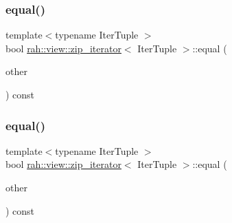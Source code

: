 \subsubsection{\texorpdfstring{equal()}{equal()}\hspace{0.1cm}{\footnotesize\ttfamily [1/2]}}
{\footnotesize\ttfamily template$<$typename Iter\+Tuple $>$ \\
bool \mbox{\hyperlink{structrah_1_1view_1_1zip__iterator}{rah\+::view\+::zip\+\_\+iterator}}$<$ Iter\+Tuple $>$\+::equal (\begin{DoxyParamCaption}\item[{\mbox{\hyperlink{structrah_1_1view_1_1zip__iterator}{zip\+\_\+iterator}}$<$ Iter\+Tuple $>$}]{other }\end{DoxyParamCaption}) const\hspace{0.3cm}{\ttfamily [inline]}}

\mbox{\label{structrah_1_1view_1_1zip__iterator_ab8712d7266cdc63143e61841fa371179}} 
\subsubsection{\texorpdfstring{equal()}{equal()}\hspace{0.1cm}{\footnotesize\ttfamily [2/2]}}
{\footnotesize\ttfamily template$<$typename Iter\+Tuple $>$ \\
bool \mbox{\hyperlink{structrah_1_1view_1_1zip__iterator}{rah\+::view\+::zip\+\_\+iterator}}$<$ Iter\+Tuple $>$\+::equal (\begin{DoxyParamCaption}\item[{\mbox{\hyperlink{structrah_1_1view_1_1zip__iterator}{zip\+\_\+iterator}}$<$ Iter\+Tuple $>$}]{other }\end{DoxyParamCaption}) const\hspace{0.3cm}{\ttfamily [inline]}}

\mbox{\label{structrah_1_1view_1_1zip__iterator_a156b181d725c31af3c34180806d6428e}} 
